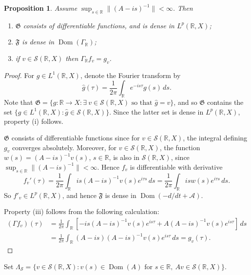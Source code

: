\documentclass[10pt,psamsfonts,leqno]{siamltex}
\newtheorem{prop}{Proposition}[section]
\newcommand{\bbR}{\mathbb{R}}
\newcommand{\calA}{\mathcal{A}}
\newcommand{\calS}{\mathcal{S}}
\newcommand{\scrG}{\mathfrak{G}}
\newcommand{\scrF}{\mathfrak{F}}
\newcommand{\Dom}{\operatorname{Dom}}
\newcommand{\lb}{\label}
\newcommand{\LpR}{{L^p(\bbR,X)}}
\begin{document}
\begin{prop}\lb{FGprops}
Assume $\sup_{s\in\bbR}\|(A-is)^{-1}\|<\infty$. Then
\begin{enumerate}
\item $\scrG$ consists of differentiable functions, and is dense in
$L^p(\bbR,X)$;
\item $\scrF$ is dense in $\Dom(\Gamma_\bbR)$;
\item if $v\in \calS(\bbR,X)$ then $\Gamma_\bbR f_v= g_v$.
\end{enumerate}
\end{prop}

\begin{proof}
For $g\in L^1(\bbR, X)$, denote the Fourier transform by
\begin{equation*}
\hat{g} (\tau) = \frac{1}{2\pi}\int_\bbR e^{-is\tau} g(s)\, ds.
\end{equation*}
Note that $\scrG = \{g:\bbR \rightarrow X : \exists \ v\in \calS(\bbR,X)
\text{ so that } \hat{g}=v\}$, and so $\scrG$ contains the set $\{g\in
L^1(\bbR,X): \hat g\in \calS(\bbR,X) \}$. Since the latter set is dense
in $\LpR$, property (i) follows.

$\scrG$ consists of differentiable functions since for $ v\in
\calS(\bbR,X)$, the integral defining $g_v$ converges absolutely.
Moreover, for $ v\in \calS(\bbR,X)$, the function
$w(s)=(A-is)^{-1}v(s)$, $s\in \bbR$, is also in $\calS(\bbR,X)$,
since $\sup_{s\in{\mathbb R}}\|(A-is)^{-1}\|<\infty$. Hence $f_v$
is differentiable with derivative
\begin{equation*}
f_v'(\tau)=\frac{1}{2\pi}\int_\bbR is(A-is)^{-1}v(s) e^{i\tau s}\, ds=
\frac{1}{2\pi}\int_\bbR is w(s) e^{i\tau s}\, ds.
\end{equation*}
So $f'_v\in \LpR$, and hence $\scrF$ is dense in $\Dom(-d/dt + \calA)$.

Property (iii) follows from the following calculation:
\begin{align*}
(\Gamma f_v)(\tau) &= \frac{1}{2\pi}
\int_\bbR [-is(A-is)^{-1}v(s)e^{is\tau}+
A(A-is)^{-1}v(s)e^{is\tau}]\, ds\\
&= \frac{1}{2\pi}\int_\bbR (A-is)(A-is)^{-1}v(s)e^{is\tau}\, ds
= g_v(\tau).
\end{align*}
\end{proof}

Set $\Lambda_{\mathcal S}= \{v\in {\mathcal S}(\bbR,X): v(s)\in
\Dom (A) \mbox{ for }s\in \bbR,\ Av\in  {\mathcal S}(\bbR,X)  \}$.
\end{document}

